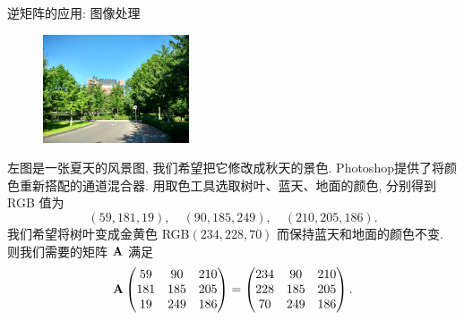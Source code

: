 \begin{frame}{逆矩阵的应用: 图像处理}
	\begin{figure}
		\centering
		\includegraphics[height=32mm]{../image/ps_in.jpg}
	\end{figure}
	\onslide<+->
	左图是一张夏天的风景图, 我们希望把它修改成秋天的景色. 
	\onslide<+->
	Photoshop提供了将颜色重新搭配的通道混合器.
	\onslide<+->
	用取色工具选取树叶、蓝天、地面的颜色, 分别得到 RGB 值为
	\[(59,181,19),\quad (90,185,249),\quad (210,205,186).\]
	\onslide<+->
	我们希望将树叶变成金黄色 RGB$(234,228,70)$ 而保持蓝天和地面的颜色不变.
	\onslide<+->
	则我们需要的矩阵 ${\mathbf{A}}$ 满足
	\[{\mathbf{A}}\begin{pmatrix}
		59&90&210\\
		181&185&205\\
		19&249&186
	\end{pmatrix}=\begin{pmatrix}
		234&90&210\\
		228&185&205\\
		70&249&186
	\end{pmatrix}.\]
\end{frame}


